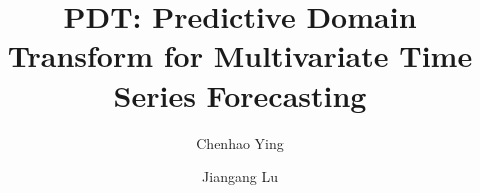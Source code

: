 \documentclass[final,3p,times]{elsarticle}
\begin{document}
\begin{frontmatter}



\title{PDT: Predictive Domain Transform for Multivariate Time Series Forecasting}


\author{Chenhao Ying}
\author{Jiangang Lu}
\address{{State Key Laboratory of Industrial Control Technology, College of Control Science and Engineering, Zhejiang University},
            {Hangzhou},
            {310027}, 
            {Zhejiang},
            {China}}





\end{frontmatter}
\end{document}
